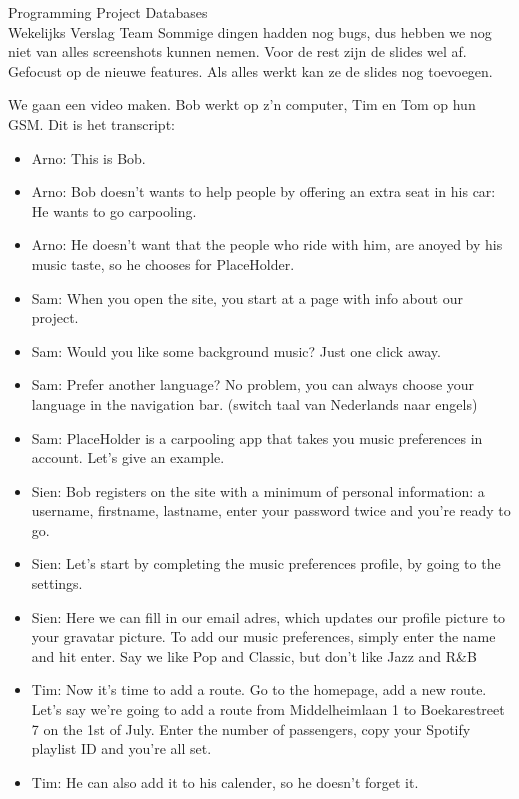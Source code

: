 \documentclass{article}
\newcounter{team}
\begin{document}
\begin{Minutes}{Programming Project Databases \\ Wekelijks Verslag Team }
            Sommige dingen hadden nog bugs, dus hebben we nog niet van alles screenshots kunnen nemen. Voor de rest zijn de slides wel af. Gefocust op de nieuwe features. Als alles werkt kan ze de slides nog toevoegen.

            We gaan een video maken. Bob werkt op z'n computer, Tim en Tom op hun GSM.
            Dit is het transcript:
            \begin{itemize}
            \item Arno: This is Bob.
            \item Arno:  Bob doesn't wants to help people by offering an extra seat in his car: He wants to go carpooling.
            \item Arno: He doesn't want that the people who ride with him, are anoyed by his music taste, so he chooses for PlaceHolder.
            \item Sam: When you open the site, you start at a page with info about our project.
            \item Sam: Would you like some background music? Just one click away.
            \item  Sam: Prefer another language? No problem, you can always choose your language in the navigation bar. (switch taal van Nederlands naar engels)
            \item  Sam: PlaceHolder is a carpooling app that takes you music preferences in account. Let's give an example.
            \item Sien: Bob registers on the site with a minimum of personal information: a username, firstname, lastname, enter your password twice and you're ready to go.
            \item Sien: Let's start by completing the music preferences profile, by going to the settings.
            \item Sien: Here we can fill in our email adres, which updates our profile picture to your gravatar picture. To add our music preferences, simply enter the name and hit enter. Say we like Pop and Classic, but don't like Jazz and R&B
            \item Tim: Now it's time to add a route. Go to the homepage, add a new route. Let's say we're going to add a route from Middelheimlaan 1 to Boekarestreet 7 on the 1st of July. Enter the number of passengers, copy your Spotify playlist ID and you're all set.
            \item Tim: He can also add it to his calender, so he doesn't forget it.

\end{itemize}
\end{Minutes}
\end{document}
